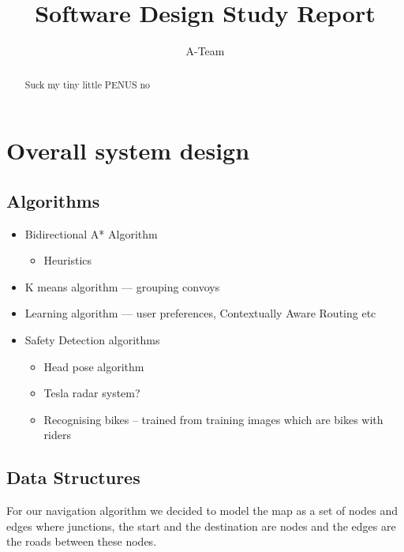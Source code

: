 \documentclass{article}
\title{Software Design Study Report}
\author{A-Team}
\begin{document}
\maketitle

\begin{abstract}
Suck my tiny little PENUS no
\end{abstract}

\section{Overall system design} \label{sec:system-design}
\subsection{Algorithms} \label{ssec:algorithms}
  \begin{itemize}
      \item Bidirectional A* Algorithm
          \begin{itemize}
              \item Heuristics
          \end{itemize}
      \item K means algorithm --- grouping convoys
      \item Learning algorithm --- user preferences, Contextually Aware Routing etc
      \item Safety Detection algorithms
        \begin{itemize}
            \item Head pose algorithm
            \item Tesla radar system?
            \item Recognising bikes -- trained from training images which are bikes with riders
        \end{itemize}
  \end{itemize}

\subsection{Data Structures} \label{ssec:data-structures}
For our navigation algorithm we decided to model the map as a set of nodes and edges where junctions, the start and the destination are nodes and the edges are the roads between these nodes.
\end{document}
